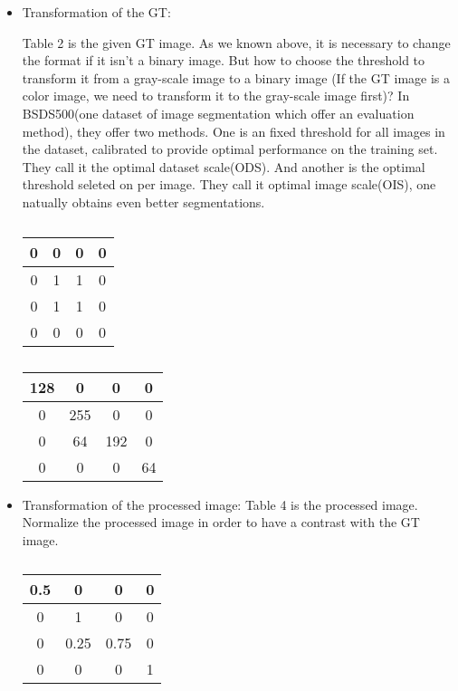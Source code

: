 \documentclass[a4paper,12pt]{article}
\begin{document}
\begin{itemize}
\item Transformation of the GT: %

Table 2 is the given GT image. As we known above, it is necessary to change the format if it isn't a binary image. But how to choose the threshold to transform it from a gray-scale image to a binary image (If the GT image is a color image, we need to transform it to the gray-scale image first)? In BSDS500(one dataset of image segmentation which offer an evaluation method), they offer two methods. One is an fixed threshold for all images in the dataset, calibrated to provide optimal performance on the training set. They call it the optimal dataset scale(ODS). And another is the optimal threshold seleted on per image. They call it optimal image scale(OIS), one natually obtains even better segmentations\cite{4:article}.
\begin{table}[h]
\centering
\begin{minipage}[t]{0.25\linewidth}
\begin{tabular}{|c|c|c|c|}
\hline
0&0&0&0\\
\hline
0&1&1&0\\
\hline
0&1&1&0\\
\hline
0&0&0&0\\
\hline
\end{tabular}
\caption{}
\end{minipage}
\begin{minipage}[t]{0.25\linewidth}
\begin{tabular}{|c|c|c|c|}
\hline
128&0&0&0\\
\hline
0&255&0&0\\
\hline
0&64&192&0\\
\hline
0&0&0&64\\
\hline
\end{tabular}
\caption{}
\end{minipage}
\end{table}

\item Transformation of the processed image: %
Table 4 is the processed image. Normalize the processed image in order to have a contrast with the GT image.
\begin{table}[ht]
\centering
\begin{tabular}{|c|c|c|c|}
\hline
0.5&0&0&0\\
\hline
0&1&0&0\\
\hline
0&0.25&0.75&0\\
\hline
0&0&0&1\\
\hline
\end{tabular}  
\caption{}
\end{table}


\end{itemize}
\end{document}
